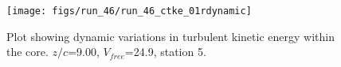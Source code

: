 \begin{figure}[H]
\centering
\texttt{[image: figs/run\_46/run\_46\_ctke\_01rdynamic]}
\caption{Plot showing dynamic variations in turbulent kinetic energy within the core. $z/c$=9.00, $V_{free}$=24.9, station 5.}
\end{figure}



